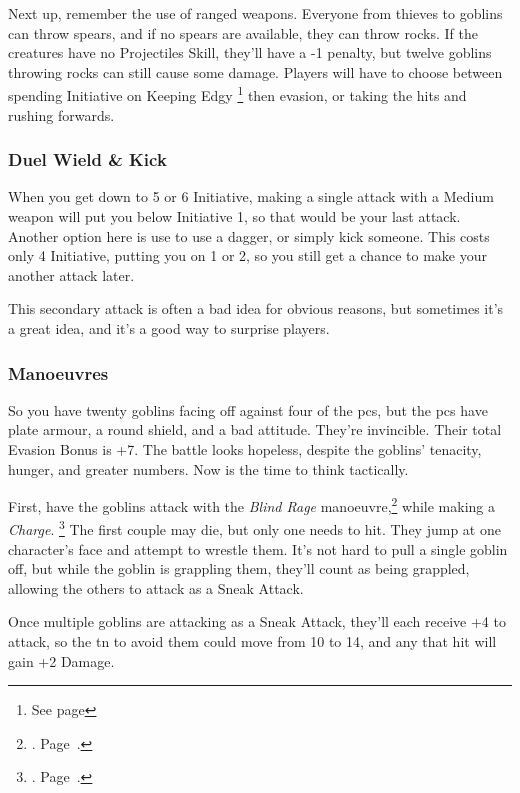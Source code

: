 \begin{multicols}{2}
Next up, remember the use of ranged weapons.
Everyone from thieves to goblins can throw spears, and if no spears are available, they can throw rocks.
If the creatures have no Projectiles Skill, they'll have a -1 penalty, but twelve goblins throwing rocks can still cause some damage.
Players will have to choose between spending Initiative on Keeping Edgy%
\footnote{See page \pageref{edgy}}
then evasion, or taking the hits and rushing forwards.

\subsubsection{Duel Wield \& Kick}

When you get down to 5 or 6 Initiative, making a single attack with a Medium weapon will put you below Initiative 1, so that would be your last attack.
Another option here is use to use a dagger, or simply kick someone.
This costs only 4 Initiative, putting you on 1 or 2, so you still get a chance to make your another attack later.

This secondary attack is often a bad idea for obvious reasons, but sometimes it's a great idea, and it's a good way to surprise players.

\subsubsection{Manoeuvres}

So you have twenty goblins facing off against four of the \glspl{pc}, but the \glspl{pc} have plate armour, a round shield, and a bad attitude.
They're invincible.
Their total Evasion Bonus is +7.
The battle looks hopeless, despite the goblins' tenacity, hunger, and greater numbers.
Now is the time to think tactically.

First, have the goblins attack with the \textit{Blind Rage} manoeuvre,\footnote{.
Page~\pageref{blindrage}.} while making a \textit{Charge}.%
\footnote{. Page~\pageref{charge}.}
The first couple may die, but only one needs to hit.
They jump at one character's face and attempt to wrestle them.
It's not hard to pull a single goblin off, but while the goblin is grappling them, they'll count as being grappled, allowing the others to attack as a Sneak Attack.

Once multiple goblins are attacking as a Sneak Attack, they'll each receive +4 to attack, so the \gls{tn} to avoid them could move from 10 to 14, and any that hit will gain +2 Damage.


\end{multicols}
